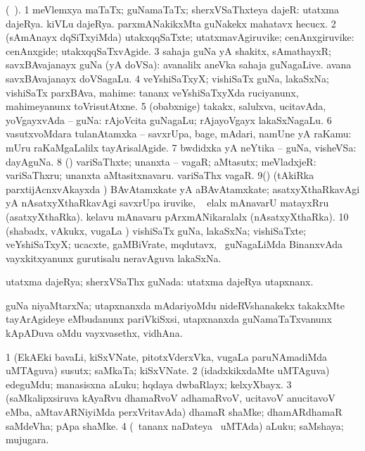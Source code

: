 \bentry
{}
\gl{\nA}
\bmng
(\bava\ ). 
\bnum
\num{1} meVlemxya maTaTx; guNamaTaTx; sherxVSaThxteya dajeR:   utatxma dajeRya.   kiVLu dajeRya.   parxmANakikxMta guNakekx mahatavx hecucx. 
\num{2} (sAmAnayx dqSiTxyiMda) utakxqqSaTxte; utatxmavAgiruvike; cenAnxgiruvike:  cenAnxgide; utakxqqSaTxvAgide. 
\num{3} sahaja guNa yA shakitx, sAmathayxR; savxBAvajanayx guNa (yA doVSa):  avanalilx aneVka sahaja guNagaLive.  avana savxBAvajanayx doVSagaLu. 
\num{4} veYshiSaTxyX; vishiSaTx guNa, lakaSxNa; vishiSaTx parxBAva, mahime:  tananx veYshiSaTxyXda ruciyanunx, mahimeyanunx toVrisutAtxne. 
\num{5} (obabxnige) takakx, salulxva, ucitavAda, yoVgayxvAda -- guNa:  rAjoVcita guNagaLu; rAjayoVgayx lakaSxNagaLu. 
\num{6} vasutxvoMdara tulanAtamxka -- savxrUpa, bage, mAdari, namUne yA raKamu:  mUru raKaMgaLalilx tayArisalAgide. 
\num{7} bwdidxka yA neYtika -- guNa, visheVSa:  dayAguNa. 
\num{8} (\pArxparx) variSaThxte; unanxta -- vagaR; aMtasutx; meVladxjeR:  variSaThxru; unanxta aMtasitxnavaru.  variSaThx vagaR. 
\num{9}(\takaR) (tAkiRka parxtijAcnxvAkayxda \vi) BAvAtamxkate yA aBAvAtamxkate; asatxyXthaRkavAgi yA nAsatxyXthaRkavAgi savxrUpa iruvike, \udA\  elalx mAnavarU matayxRru (asatxyXthaRka).  kelavu mAnavaru pArxmANikaralalx (nAsatxyXthaRka). 
\num{10} (shabadx, vAkukx, \mo vugaLa \vi) vishiSaTx guNa, lakaSxNa; vishiSaTxte; veYshiSaTxyX; ucacxte, gaMBiVrate, mqdutavx, \mo\ guNagaLiMda BinanxvAda vayx\-kitxyanunx gurutisalu neravAguva lakaSxNa. 
\enum
\emng
\eentry

\bentry
{}
\gl{\gu}
\bmng
utatxma dajeRya; sherxVSaThx guNada:   utatxma dajeRya utapxnanx. 
\emng
\eentry

\bentry
{}
\gl{\nA}
\bmng
guNa niyaMtarxNa; utapxnanxda mAdariyoMdu nideRVshanakekx takakxMte tayArAgideye eMbudanunx pariVkiSxsi, utapxnanxda guNamaTaTxvanunx kApADuva oMdu vayxvasethx, vidhAna. 
\emng
\eentry

\bentry
{}
\gl{\nA}
\bmng
\bnum
\num{1} (EkAEki bavaLi, kiSxVNate, pitotxVderxVka, \mo vugaLa paruNAmadiMda uMTAguva) susutx; saMkaTa; kiSxVNate. 
\num{2} (idadxkikxdaMte uMTAguva) edeguMdu; manasisxna aLuku; hqdaya dwbaRlayx; kelxyXbayx. 
\num{3} (saMkalipxsiruva kAyaRvu dhamaRvoV adhamaRvoV, ucitavoV anucitavoV eMba, aMtavARNiyiMda perxVritavAda) dhamaR shaMke; dhamARdhamaR saMdeVha; pApa shaMke. 
\num{4} (\kanmu\ tananx naDateya \vi\ uMTAda) aLuku; saMshaya; mujugara. 
\enum
\emng
\eentry

